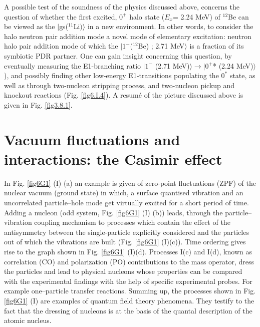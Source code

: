 \begin{subappendices}
A  possible test of the soundness of the physics  discussed above, concerns the question of whether the first excited, 
$0^+$ halo state ($E_x$= 2.24 MeV) of $^{12}$Be can be viewed as the $|$gs($^{11}$Li$)\rangle$ in a new environment. In other words, 
to consider the halo neutron pair addition mode
 a novel mode of  elementary excitation: neutron halo pair  addition mode of which the $|1^- $($^{12}$Be) ; 2.71 MeV$\rangle $ is 
 a fraction of  its symbiotic  PDR partner. One can gain insight concerning this question, by 
 eventually measuring the E1-branching ratio $|1^-$ (2.71 MeV)$\rangle  \to |0^+$* (2.24 MeV)$\rangle$ ), and possibly 
 finding other low-energy E1-transitions populating the $0^*$ state, as well as through  two-nucleon stripping process,
 and two-nucleon pickup and knockout reactions (Fig. \ref{fig6.I.4}).
 A resum\'e of the picture discussed above is given   in Fig. \ref{fig3.8.1}.
 \FloatBarrier
 \section[Vacuum fluctuations: the Casimir effect]{Vacuum fluctuations and interactions: the Casimir effect}\label{C7AppG}
In Fig. \ref{fig6G1} (I) (a) an example is given of  zero-point fluctuations (ZPF) of the nuclear vacuum (ground state) in which, a surface quantised vibration and an uncorrelated particle--hole mode get virtually excited for a short period of time.  Adding 
a nucleon (odd system, Fig. \ref{fig6G1} (I) (b)) leads, through the particle--vibration coupling mechanism to processes which contain the effect of the antisymmetry between the single-particle explicitly considered and the particles out of which  the vibrations are built  (Fig. \ref{fig6G1} (I)(c)). Time ordering 
gives rise to the graph shown in Fig. \ref{fig6G1} (I)(d). Processes I(c) and I(d),  known as correlation (CO) and polarization (PO) contributions to the mass
operator,  dress the particles and lead to physical nucleons  whose properties can be compared with the experimental findings with the help of specific experimental probes. For example one--particle transfer reactions. Summing up, 
the processes shown in Fig. \ref{fig6G1} (I) are examples of quantum field theory phenomena. They testify  to the fact that the dressing of nucleons is at the basis of the quantal description of the atomic nucleus. 


\end{subappendices}
